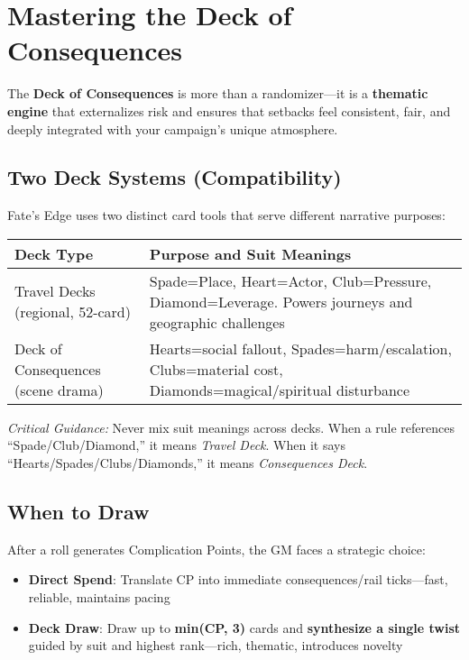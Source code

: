 \section*{Mastering the Deck of Consequences}

The \textbf{Deck of Consequences} is more than a randomizer---it is a \textbf{thematic engine} that externalizes risk and ensures that setbacks feel consistent, fair, and deeply integrated with your campaign's unique atmosphere.

\subsection*{Two Deck Systems (Compatibility)}

Fate's Edge uses two distinct card tools that serve different narrative purposes:

\begin{fatebox}
\begin{tabularx}{\textwidth}{lX}
\toprule
\textbf{Deck Type} & \textbf{Purpose and Suit Meanings} \\
\midrule
Travel Decks (regional, 52-card) & Spade=Place, Heart=Actor, Club=Pressure, Diamond=Leverage. Powers journeys and geographic challenges \\
Deck of Consequences (scene drama) & Hearts=social fallout, Spades=harm/escalation, Clubs=material cost, Diamonds=magical/spiritual disturbance \\
\bottomrule
\end{tabularx}
\end{fatebox}

\textit{Critical Guidance:} Never mix suit meanings across decks. When a rule references ``Spade/Club/Diamond,'' it means \emph{Travel Deck}. When it says ``Hearts/Spades/Clubs/Diamonds,'' it means \emph{Consequences Deck}.

\subsection*{When to Draw}

After a roll generates Complication Points, the GM faces a strategic choice:

\begin{itemize}
    \item \textbf{Direct Spend}: Translate CP into immediate consequences/rail ticks—fast, reliable, maintains pacing
    \item \textbf{Deck Draw}: Draw up to \textbf{min(CP, 3)} cards and \textbf{synthesize a single twist} guided by suit and highest rank—rich, thematic, introduces novelty
\end{itemize}

